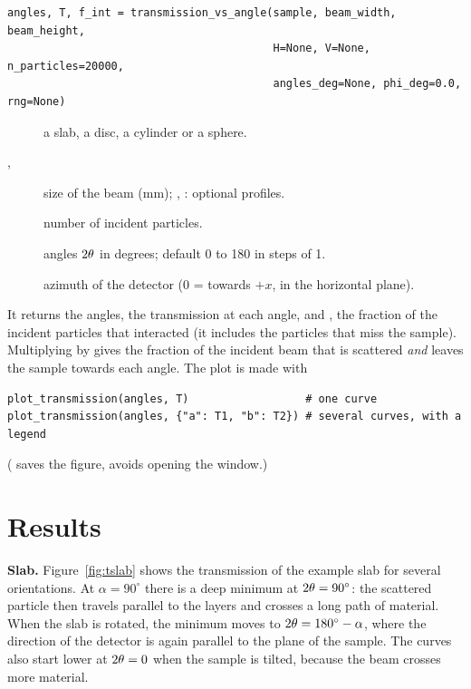 \begin{lstlisting}
angles, T, f_int = transmission_vs_angle(sample, beam_width, beam_height,
                                         H=None, V=None, n_particles=20000,
                                         angles_deg=None, phi_deg=0.0, rng=None)
\end{lstlisting}
\begin{description}
  \item[] a slab, a disc, a cylinder or a sphere.
  \item[, ] size of the beam (mm); , : optional profiles.
  \item[] number of incident particles.
  \item[] angles $2\theta$ in degrees; default 0 to 180 in steps of 1.
  \item[] azimuth of the detector (0 = towards $+x$, in the horizontal plane).
\end{description}
It returns the angles, the transmission at each angle, and , the fraction of the incident particles that interacted (it
includes the particles that miss the sample). Multiplying  by  gives the fraction of the incident beam that is
scattered \emph{and} leaves the sample towards each angle. The plot is made with
\begin{lstlisting}
plot_transmission(angles, T)                  # one curve
plot_transmission(angles, {"a": T1, "b": T2}) # several curves, with a legend
\end{lstlisting}
( saves the figure,  avoids opening the window.)


\section{Results}

\textbf{Slab.} Figure~\ref{fig:tslab} shows the transmission of the example slab for several orientations. At $\alpha=90^\circ$ there is a deep minimum
at $2\theta=90^\circ$: the scattered particle then travels parallel to the layers and crosses a long path of material. When the slab is
rotated, the minimum moves to $2\theta=180^\circ-\alpha$, where the direction of the detector is again parallel to the plane of the sample.
The curves also start lower at $2\theta=0$ when the sample is tilted, because the beam crosses more material.

